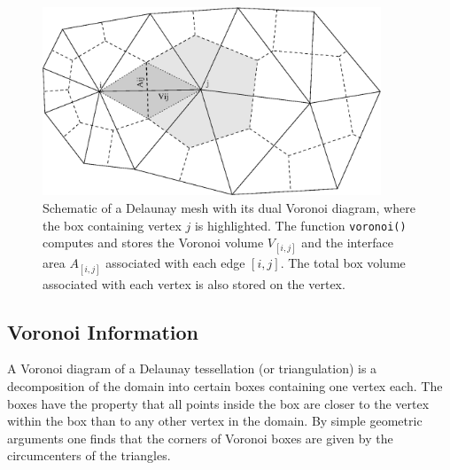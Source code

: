 \begin{figure}[tb]
\centering
 \includegraphics[width=0.9\textwidth]{figures/voronoi.eps}
 \caption{Schematic of a Delaunay mesh with its dual Voronoi diagram, where the box containing vertex $j$ is highlighted.
    The function \lstinline|voronoi()| computes and stores the Voronoi volume $V_{[i,j]}$ and the interface area $A_{[i,j]}$ associated with each edge $[i,j]$.
    The total box volume associated with each vertex is also stored on the vertex.}
 \label{fig:voronoi}
\end{figure}

 \subsection{Voronoi Information}
 A Voronoi diagram of a Delaunay tessellation (or triangulation) is a decomposition of the domain into certain boxes containing one vertex each.
 The boxes have the property that all points inside the box are closer to the vertex within the box than to any other vertex in the domain. 
 By simple geometric arguments one finds that the corners of Voronoi boxes are given by the circumcenters of the triangles.

